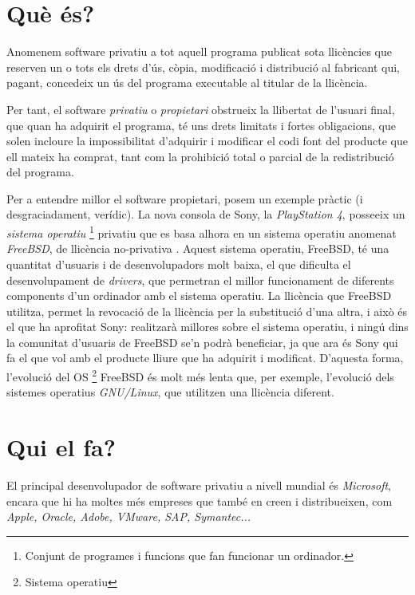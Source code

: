\section{Què és?}

	Anomenem software privatiu a tot aquell programa publicat sota llicències
	que reserven un o tots els drets d'ús, còpia, modificació i distribució
	al fabricant qui, pagant, concedeix un ús del programa executable al titular
	de la llicència.

	Per tant, el software \emph{privatiu} o \emph{propietari} obstrueix la llibertat
	de l'usuari final, que quan ha adquirit el programa, té uns drets limitats i fortes
	obligacions, que solen incloure la impossibilitat d'adquirir i modificar el codi font del producte
	que ell mateix ha comprat, tant com la prohibició total o parcial de la redistribució del programa.
	\cite{gnucategories}

	Per a entendre millor el software propietari, posem un exemple pràctic (i desgraciadament, verídic).
	La nova consola de Sony, la \emph{PlayStation 4}, posseeix un \emph{sistema operatiu} \footnote{Conjunt
	de programes i funcions que fan funcionar un ordinador.} privatiu que es basa alhora en un sistema operatiu
	anomenat \emph{FreeBSD}, de llicència no-privativa \cite{freebsdlicense}. Aquest sistema operatiu, FreeBSD, té una
	quantitat d'usuaris i de desenvolupadors molt baixa, el que dificulta el desenvolupament de \emph{drivers}, que
	permetran el millor funcionament de diferents components d'un ordinador amb el sistema operatiu. La llicència que FreeBSD utilitza, permet
	la revocació de la llicència per la substitució d'una altra, i això és el que ha aprofitat Sony: realitzarà millores
	sobre el sistema operatiu, i ningú dins la comunitat d'usuaris de FreeBSD se'n podrà beneficiar, ja que ara és Sony qui
	fa el que vol amb el producte lliure que ha adquirit i modificat. D'aquesta forma, l'evolució del OS \footnote{Sistema operatiu}
	FreeBSD és molt més lenta que, per exemple, l'evolució dels sistemes operatius \emph{GNU/Linux}, que utilitzen
	una llicència diferent.

\section{Qui el fa?}

	El principal desenvolupador de software privatiu a nivell mundial és \emph{Microsoft}, encara que hi
	ha moltes més empreses que també en creen i distribueixen, com \emph{Apple, Oracle, Adobe, VMware,
	SAP, Symantec...} \cite{privatiuempreses}

